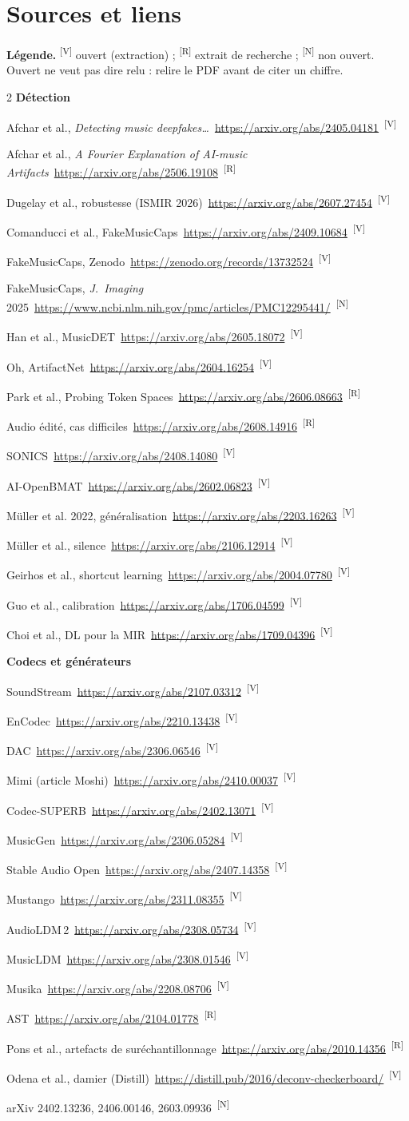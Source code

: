 \documentclass[10pt,a4paper]{article}
\newcommand{\sV}{\textsuperscript{\scriptsize\textcolor{green!40!black}{[V]}}}
\newcommand{\sR}{\textsuperscript{\scriptsize\textcolor{orange!80!black}{[R]}}}
\newcommand{\sN}{\textsuperscript{\scriptsize\textcolor{black!60}{[N]}}}
\begin{document}
\appendix
\section{Sources et liens}\label{app:sources}
\begingroup{}\footnotesize\raggedright\setlength{\parskip}{1pt}
\newcommand{\src}[3]{\par\noindent #1~\url{#2}~#3}
\textbf{Légende.} \sV{} ouvert (extraction) ; \sR{} extrait de recherche ; \sN{} non ouvert. Ouvert ne veut pas dire relu : relire le PDF avant de citer un chiffre.
\begin{multicols}{2}
\textbf{Détection}
\src{Afchar et al., \emph{Detecting music deepfakes…}}{https://arxiv.org/abs/2405.04181}{\sV}
\src{Afchar et al., \emph{A Fourier Explanation of AI-music Artifacts}}{https://arxiv.org/abs/2506.19108}{\sR}
\src{Dugelay et al., robustesse (ISMIR 2026)}{https://arxiv.org/abs/2607.27454}{\sV}
\src{Comanducci et al., FakeMusicCaps}{https://arxiv.org/abs/2409.10684}{\sV}
\src{FakeMusicCaps, Zenodo}{https://zenodo.org/records/13732524}{\sV}
\src{FakeMusicCaps, \emph{J.~Imaging} 2025}{https://www.ncbi.nlm.nih.gov/pmc/articles/PMC12295441/}{\sN}
\src{Han et al., MusicDET}{https://arxiv.org/abs/2605.18072}{\sV}
\src{Oh, ArtifactNet}{https://arxiv.org/abs/2604.16254}{\sV}
\src{Park et al., Probing Token Spaces}{https://arxiv.org/abs/2606.08663}{\sR}
\src{Audio édité, cas difficiles}{https://arxiv.org/abs/2608.14916}{\sR}
\src{SONICS}{https://arxiv.org/abs/2408.14080}{\sV}
\src{AI-OpenBMAT}{https://arxiv.org/abs/2602.06823}{\sV}
\src{Müller et al. 2022, généralisation}{https://arxiv.org/abs/2203.16263}{\sV}
\src{Müller et al., silence}{https://arxiv.org/abs/2106.12914}{\sV}
\src{Geirhos et al., shortcut learning}{https://arxiv.org/abs/2004.07780}{\sV}
\src{Guo et al., calibration}{https://arxiv.org/abs/1706.04599}{\sV}
\src{Choi et al., DL pour la MIR}{https://arxiv.org/abs/1709.04396}{\sV}

\textbf{Codecs et générateurs}
\src{SoundStream}{https://arxiv.org/abs/2107.03312}{\sV}
\src{EnCodec}{https://arxiv.org/abs/2210.13438}{\sV}
\src{DAC}{https://arxiv.org/abs/2306.06546}{\sV}
\src{Mimi (article Moshi)}{https://arxiv.org/abs/2410.00037}{\sV}
\src{Codec-SUPERB}{https://arxiv.org/abs/2402.13071}{\sV}
\src{MusicGen}{https://arxiv.org/abs/2306.05284}{\sV}
\src{Stable Audio Open}{https://arxiv.org/abs/2407.14358}{\sV}
\src{Mustango}{https://arxiv.org/abs/2311.08355}{\sV}
\src{AudioLDM\,2}{https://arxiv.org/abs/2308.05734}{\sV}
\src{MusicLDM}{https://arxiv.org/abs/2308.01546}{\sV}
\src{Musika}{https://arxiv.org/abs/2208.08706}{\sV}
\src{AST}{https://arxiv.org/abs/2104.01778}{\sR}
\src{Pons et al., artefacts de suréchantillonnage}{https://arxiv.org/abs/2010.14356}{\sR}
\src{Odena et al., damier (Distill)}{https://distill.pub/2016/deconv-checkerboard/}{\sV}
\par\noindent arXiv 2402.13236, 2406.00146, 2603.09936~\sN


\end{multicols}
\end{document}
